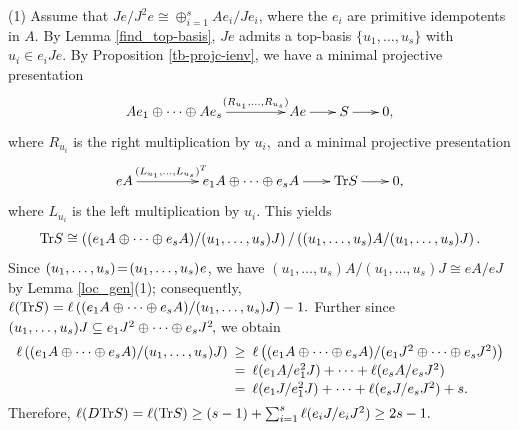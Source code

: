 \documentclass[10pt]{amsart}
\theoremstyle{definition}
\newcommand{\hp}{\hspace{.5pt}}
\begin{document}
 (1) Assume that $Je/J^2e\cong \oplus_{i=1}^s Ae_i/Je_i$, \vspace{.5pt} where the $e_i$ are primitive idempotents in $A$. By Lemma \ref{find_top-basis}, $Je$ admits a top-basis 
$\{u_1, \ldots, u_s\}$ with $u_i\in e_i J e.$ 
By Proposition \ref{tb-projc-ienv}, we have a minimal projective presentation
\vspace{-4.5pt}
$$\xymatrixcolsep{18pt}\xymatrix{Ae_1\oplus \cdots \oplus Ae_s \ar[rr]^--{(R_{u_1}, \ldots, R_{u_s})} && Ae \ar[r] & S \ar[r]  & 0,}
\vspace{-4pt}$$
where $R_{u_i}$ is the right multiplication by $u_i,$ and a minimal projective presentation 
\vspace{-3pt}
$$\xymatrixcolsep{19pt}\xymatrix{e A \ar[rr]^--{(L_{u_1}, \ldots, L_{u_s})^T\hspace{-5pt}} && e_1A\oplus \cdots\oplus e_sA \ar[r] &  {\rm Tr}S\ar[r]  & 0,} \vspace{-1pt}$$ where $L_{u_i}$ is the left multiplication by $u_i$. This yields \vspace{-2pt}
$${\rm Tr}S  \cong  \left((e_1A\oplus \cdots\oplus e_sA)/(u_1,\ldots,u_s)J\right)/\left((u_1,\ldots,u_s)A/(u_1,\ldots,u_s)J\right).
\vspace{-2pt}$$
%
Since $(u_1,\ldots,u_s)\!=\!(u_1,\ldots,u_s)\hp e$, \vspace{1pt} we have $(u_1,\ldots,u_s)A / (u_1,\ldots,u_s)J \!\cong\! eA/eJ$ by Lemma \ref{loc_gen}(1); consequently, $\ell({\rm Tr}S) = \ell\left((e_1A\oplus \cdots\oplus e_sA)/(u_1,\ldots,u_s)J\right)-1.$ Further since $(u_1,\ldots,u_s)J\subseteq e_1J^2\oplus \cdots\oplus e_sJ^2\hspace{-1pt},$
we obtain \vspace{-2pt}
$$\begin{array}{rcl}\ell\left((e_1A\oplus \cdots\oplus e_sA)/(u_1,\ldots,u_s)J\right) \hspace{-5pt} &  \ge \hspace{-5pt} &\ell\left((e_1A\oplus \cdots\oplus e_sA)/(e_1J^2\oplus \cdots\oplus e_sJ^2)\right)\vspace{1.3pt} \\ 
\hspace{-5pt} &= \hspace{-5pt}& \ell(e_1A/e_1^2J) + \cdots + \ell(e_sA/e_sJ^2) \vspace{1.3pt} \\
\hspace{-5pt} &= \hspace{-5pt}& \ell(e_1J/e_1^2J) + \cdots + \ell(e_sJ/e_sJ^2)+s.
\vspace{-3.5pt}
\end{array}$$
Therefore,
$\ell(D{\rm Tr}S)=\ell({\rm Tr}S)\ge (s-1) + \sum_{i=1}^s\ell(e_iJ/e_iJ^2)\ge 2s-1.$ 
\end{document}
